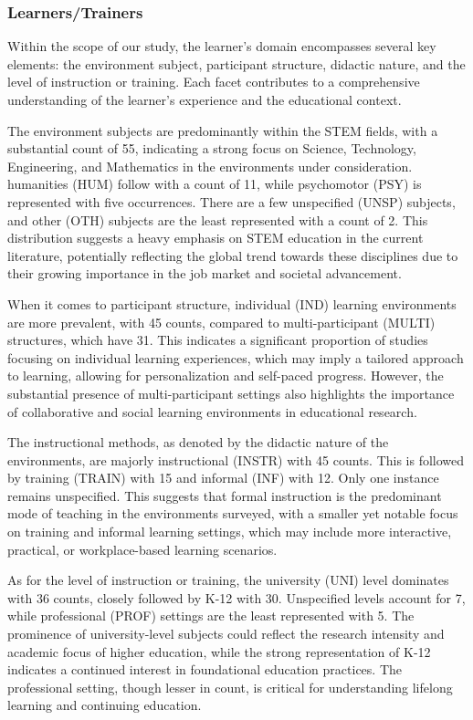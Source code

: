 \documentclass[manuscript,screen,review]{acmart}
\begin{document}
\subsubsection{Learners/Trainers}
Within the scope of our study, the learner's domain encompasses several key elements: the environment subject, participant structure, didactic nature, and the level of instruction or training. Each facet contributes to a comprehensive understanding of the learner's experience and the educational context.

The environment subjects are predominantly within the STEM fields, with a substantial count of 55, indicating a strong focus on Science, Technology, Engineering, and Mathematics in the environments under consideration. humanities (HUM) follow with a count of 11, while psychomotor (PSY) is represented with five occurrences. There are a few unspecified (UNSP) subjects, and other (OTH) subjects are the least represented with a count of 2. This distribution suggests a heavy emphasis on STEM education in the current literature, potentially reflecting the global trend towards these disciplines due to their growing importance in the job market and societal advancement.

When it comes to participant structure, individual (IND) learning environments are more prevalent, with 45 counts, compared to multi-participant (MULTI) structures, which have 31. This indicates a significant proportion of studies focusing on individual learning experiences, which may imply a tailored approach to learning, allowing for personalization and self-paced progress. However, the substantial presence of multi-participant settings also highlights the importance of collaborative and social learning environments in educational research.

The instructional methods, as denoted by the didactic nature of the environments, are majorly instructional (INSTR) with 45 counts. This is followed by training (TRAIN) with 15 and informal (INF) with 12. Only one instance remains unspecified. This suggests that formal instruction is the predominant mode of teaching in the environments surveyed, with a smaller yet notable focus on training and informal learning settings, which may include more interactive, practical, or workplace-based learning scenarios.

As for the level of instruction or training, the university (UNI) level dominates with 36 counts, closely followed by K-12 with 30. Unspecified levels account for 7, while professional (PROF) settings are the least represented with 5. The prominence of university-level subjects could reflect the research intensity and academic focus of higher education, while the strong representation of K-12 indicates a continued interest in foundational education practices. The professional setting, though lesser in count, is critical for understanding lifelong learning and continuing education.
\end{document}

